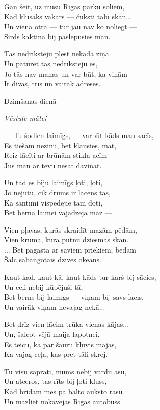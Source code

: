 \documentclass[14pt]{extarticle}
\begin{document}
{{Gan šeit, uz mūsu Rīgas parku soliem,\\
Kad klusāks vakars --- čuksti tālu skan...\\
Un viena otra --- tur jau nav ko noliegt ---\\
Sirds kaktiņā bij paslēpusies man. 

Tās nedrīkstēju plēst nekādā ziņā\\
Un paturēt tās nedrīkstēju es,\\
Jo tās nav manas un var būt, ka viņām\\
Ir divas, trīs un vairāk adreses.


\newpage

{\large \sc Dzimšanas dienā}

{\em Vēstule mātei}

--- Tu šodien laimīgs, --- varbūt kāds man sacīs,\\
Es tiešām nezinu, bet klausies, māt,\\
Reiz lācīti ar brūnām stikla acīm\\
Jūs man ar tēvu nesāt dāvināt. 

Un tad es biju laimīgs ļoti, ļoti,\\
Jo nejutu, cik drūms ir lācēns tas,\\
Ka santīmi vispēdējie tam doti,\\
Bet bērna laimei vajadzēja maz ---

Vien pļavas, kurās skraidīt mazām pēdām,\\
Vien krūma, kurā putnu dziesmas skan.\\
... Bet pagastā ar saviem priekiem, bēdām\\
Šalc sabangotais dzīves okeāns.

Kaut kad, kaut kā, kaut kāds tur karš bij sācies,\\
Un ceļi nebij kūpējuši tā,\\
Bet bērns bij laimīgs --- viņam bij savs lācis,\\
Un vairāk viņam nevajag nekā...

Bet drīz vien lācim trūka vienas kājas...\\
Un, šalcot vējā maija lapotnei,\\
Es teicu, ka par šauru kļuvis mājās,\\
Ka vajag ceļa, kas pret tāli skrej. 

Tu visu saprati, mums nebij vārdu asu,\\
Un atceros, tas rīts bij ļoti kluss,\\
Kad bridām mēs pa balto auksto rasu\\
Un mazliet nokavējās Rīgas autobuss. 

}}
\end{document}
